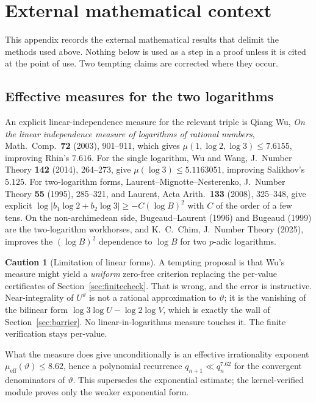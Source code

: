 \documentclass[11pt,oneside]{article}
\theoremstyle{definition}
\newtheorem{warning}[theorem]{Caution}
\theoremstyle{remark}
\newcommand{\thetaq}{\vartheta}
\newcommand{\lean}[1]{\texttt{\detokenize{#1}}}
\begin{document}
\section{External mathematical context}
\label{app:literature}

This appendix records the external mathematical results that delimit the methods used above.
Nothing below is used as a step in a proof unless it is cited at the point of use.  Two tempting
claims are corrected where they occur.

\subsection{Effective measures for the two logarithms}

An explicit linear-independence measure for the relevant triple is Qiang Wu, \emph{On the
linear independence measure of logarithms of rational numbers}, Math.\ Comp.\ \textbf{72}
(2003), 901--911, which gives $\mu(1,\log2,\log3)\le7.6155$, improving Rhin's $7.616$.  For the
single logarithm, Wu and Wang, J.\ Number Theory \textbf{142} (2014), 264--273, give
$\mu(\log3)\le5.1163051$, improving Salikhov's $5.125$.  For two-logarithm forms,
Laurent--Mignotte--Nesterenko, J.\ Number Theory \textbf{55} (1995), 285--321, and Laurent,
Acta Arith.\ \textbf{133} (2008), 325--348, give explicit
$\log|b_1\log2+b_2\log3|\ge-C(\log B)^2$ with $C$ of the order of a few tens.  On the
non-archimedean side, Bugeaud--Laurent (1996) and Bugeaud (1999) are the two-logarithm
workhorses, and K.~C.~Chim, J.\ Number Theory (2025), improves the $(\log B)^2$ dependence to
$\log B$ for two $p$-adic logarithms.

\begin{warning}[Limitation of linear forms]
A tempting proposal is that Wu's measure might yield a \emph{uniform} zero-free criterion
replacing the per-value certificates of Section~\ref{sec:finitecheck}.  That is wrong, and the
error is instructive.  Near-integrality of $U^{\thetaq}$ is not a rational approximation to
$\thetaq$; it is the vanishing of the bilinear form $\log3\log U-\log2\log V$, which is exactly
the wall of Section~\ref{sec:barrier}.  No linear-in-logarithms measure touches it.  The finite
verification stays per-value.
\end{warning}

What the measure does give unconditionally is an effective irrationality exponent
$\mu_{\mathrm{eff}}(\thetaq)\le8.62$, hence a polynomial recurrence $q_{n+1}\ll q_n^{7.62}$ for
the convergent denominators of $\thetaq$.  This supersedes the exponential estimate; the
kernel-verified module \lean{DenominatorGrowth} proves only the weaker exponential form.
\end{document}
